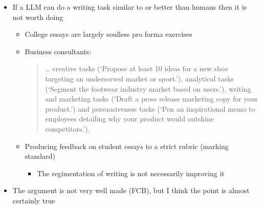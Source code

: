 \documentclass[25pt,a4paper,landscape,headrule,footrule,xetex]{foils}
\begin{document}
\begin{itemize}
\item If a LLM can do a writing task similar to or better than humans
  then it is not worth doing
  \begin{itemize}
  \item College essays are largely soulless pro forma exercises
  \item Business consultants:
    \begin{quote}
      … creative tasks (‘Propose at least 10 ideas for a new shoe targeting an underserved market or sport.’), analytical tasks (‘Segment the footwear industry market based on users.’), writing and marketing tasks (‘Draft a press release marketing copy for your product.’) and persuasiveness tasks (‘Pen an inspirational memo to employees detailing why your product would outshine competitors.’).
    \end{quote}
    
  \item Producing feedback on student essays to a strict rubric
    (marking standard)
    \begin{itemize}
    \item The regimentation of writing is not necessarily improving it
    \end{itemize}
  \end{itemize}
\item The argument is not very well made (FCB), but I think the point is almost certainly true
\end{itemize}


\end{document}
